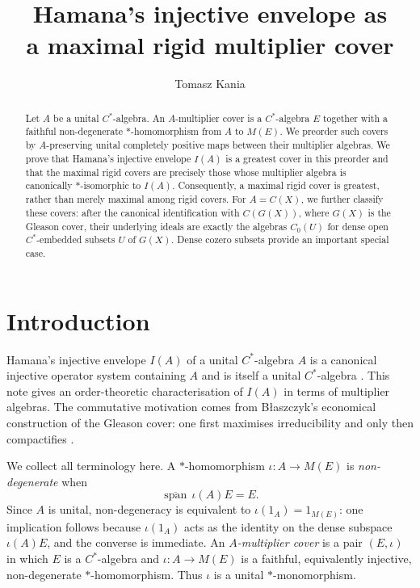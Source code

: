 \documentclass[11pt,a4paper]{amsart}
\title[Hamana's injective envelope as a maximal rigid multiplier cover]{Hamana's injective envelope as\\ a maximal rigid multiplier cover}
\date{}
\author[T.~Kania]{Tomasz Kania}
\numberwithin{equation}{section}
\theoremstyle{paperplain}
\theoremstyle{remark}
\begin{document}
\begin{abstract}
Let $A$ be a unital $C^*$-algebra. An $A$-multiplier cover is a $C^*$-algebra $E$ together with a faithful non-degenerate $*$-homomorphism from $A$ to $M(E)$. We preorder such covers by $A$-preserving unital completely positive maps between their multiplier algebras. We prove that Hamana's injective envelope $I(A)$ is a greatest cover in this preorder and that the maximal rigid covers are precisely those whose multiplier algebra is canonically $*$-isomorphic to $I(A)$. Consequently, a maximal rigid cover is greatest, rather than merely maximal among rigid covers. For $A=C(X)$, we further classify these covers: after the canonical identification with $C(G(X))$, where $G(X)$ is the Gleason cover, their underlying ideals are exactly the algebras $C_0(U)$ for dense open $C^*$-embedded subsets $U$ of $G(X)$. Dense cozero subsets provide an important special case.
\end{abstract}

\maketitle

\section{Introduction}

Hamana's injective envelope $I(A)$ of a unital $C^*$-algebra $A$ is a canonical injective operator system containing $A$ and is itself a unital $C^*$-algebra \cite{Hamana1979OS,Hamana1979Cstar}. This note gives an order-theoretic characterisation of $I(A)$ in terms of multiplier algebras. The commutative motivation comes from B{\l}aszczyk's economical construction of the Gleason cover: one first maximises irreducibility and only then compactifies \cite{Blaszczyk}.

We collect all terminology here. A $*$-homomorphism $\iota\colon A\to M(E)$ is \emph{non-degenerate} when
\[
\overline{\operatorname{span}}\,\iota(A)E=E.
\]
Since $A$ is unital, non-degeneracy is equivalent to $\iota(1_A)=1_{M(E)}$: one implication follows because $\iota(1_A)$ acts as the identity on the dense subspace $\iota(A)E$, and the converse is immediate. An \emph{$A$-multiplier cover} is a pair $(E,\iota)$ in which $E$ is a $C^*$-algebra and $\iota\colon A\to M(E)$ is a faithful, equivalently injective, non-degenerate $*$-homomorphism. Thus $\iota$ is a unital $*$-monomorphism.
\end{document}
